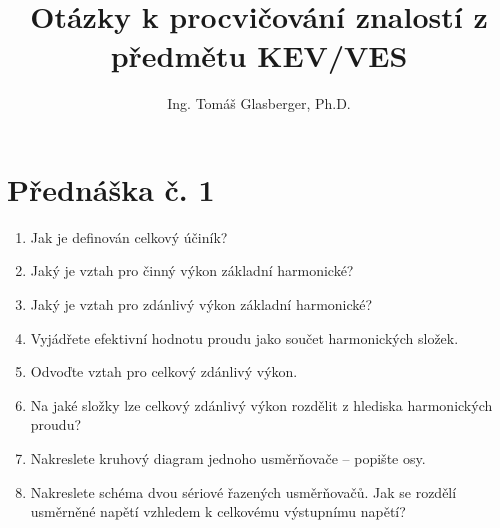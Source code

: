\documentclass[a4paper, 12pt]{article}
\title{Otázky k procvičování znalostí z předmětu KEV/VES}
\author{Ing. Tomáš Glasberger, Ph.D.}
\begin{document}
\maketitle
\section{Přednáška č. 1}
\begin{enumerate}
    \item Jak je definován celkový účiník?
    \item Jaký je vztah pro činný výkon základní harmonické?
    \item Jaký je vztah pro zdánlivý výkon základní harmonické?
    \item Vyjádřete efektivní hodnotu proudu jako součet harmonických složek.
    \item Odvoďte vztah pro celkový zdánlivý výkon.
    \item Na jaké složky lze celkový zdánlivý výkon rozdělit z hlediska harmonických proudu?
    \item Nakreslete kruhový diagram jednoho usměrňovače -- popište osy.
    \item Nakreslete schéma dvou sériové řazených usměrňovačů. Jak se rozdělí usměrněné napětí vzhledem k celkovému výstupnímu napětí?
\end{enumerate}
\end{document}
